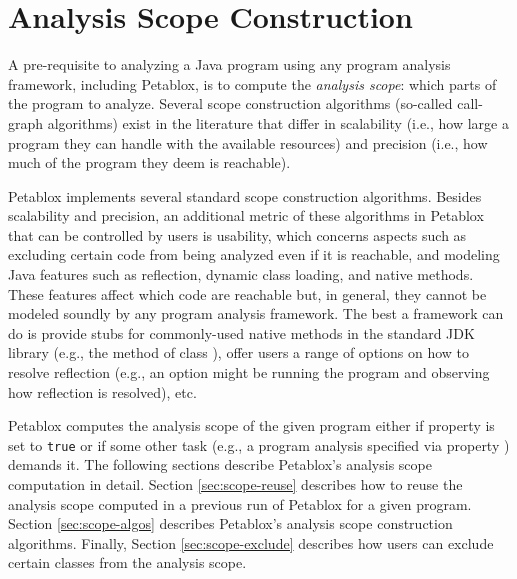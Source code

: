 \chapter{Analysis Scope Construction}
\label{chap:scope}

A pre-requisite to analyzing a Java program using any program analysis framework,
including Petablox, is to compute the {\it analysis scope}: which parts of the
program to analyze.  Several scope construction algorithms (so-called
call-graph algorithms) exist in the literature that differ in scalability (i.e.,
how large a program they can handle with the available resources) and precision (i.e., 
how much of the program they deem is reachable).

Petablox implements several standard scope construction algorithms.  Besides scalability and precision,
an additional metric of these algorithms in Petablox that can be controlled by users is usability,
which concerns aspects such as excluding certain code from being analyzed even if it
is reachable, and modeling Java features such as reflection, dynamic class loading, and native methods.
These features affect which code are
reachable but, in general, they cannot be modeled soundly by any program analysis framework.  The best
a framework can do is
 provide stubs for commonly-used native methods in the standard JDK library (e.g., the 
method of class ), 
offer users a range of options on how to resolve reflection (e.g.,
an option might be running the program and observing how reflection is resolved), etc.

Petablox computes the analysis scope of the given
program either if property  is set to {\tt true} or if some other task
(e.g., a program analysis specified via property ) demands it.
The following sections describe Petablox's analysis scope 
computation in detail.  Section \ref{sec:scope-reuse} describes how to reuse the analysis scope
computed in a previous run of Petablox for a given program.  Section \ref{sec:scope-algos} describes
Petablox's analysis scope construction algorithms.  Finally, Section \ref{sec:scope-exclude} describes how users
can exclude certain classes from the analysis scope.

